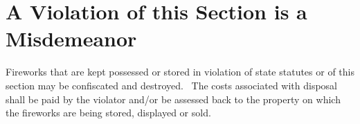 \section{A Violation of this Section is a Misdemeanor}
Fireworks that are kept possessed or stored in violation of state statutes or of this section may be confiscated and destroyed.  The costs associated with disposal shall be paid by the violator and/or be assessed back to the property on which the fireworks are being stored, displayed or sold.
